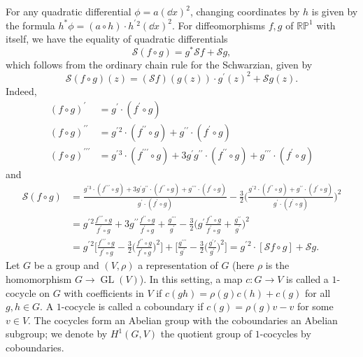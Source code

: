 \documentclass[11pt,leqno]{article}
\theoremstyle{plain}
\theoremstyle{definition}
\numberwithin{equation}{section}
\numberwithin{lem}{section}
\DeclareMathOperator{\GL}{GL}
\begin{document}
For any quadratic differential $\phi = a(\dd x)^2$, changing coordinates by $h$ is given by the formula $h^\ast\phi = (a\circ h)\cdot h^\prime{}^2(\dd x)^2$. For diffeomorphisms $f,g$ of $\mathbb{RP}^1$ with itself, we have the equality of quadratic differentials
\begin{equation}\label{eq: chain}
    \mathscr S(f\circ g) = g^\ast\mathscr Sf + \mathscr Sg,
\end{equation}
which follows from the ordinary chain rule for the Schwarzian, given by
\[\mathscr S(f\circ g)(z) = (\mathscr Sf)(g(z))\cdot g^{\prime}(z)^2 + \mathscr Sg(z).\]
Indeed, 
\begin{align*}
    (f\circ g)^{\prime} &= g^\prime\cdot (f^\prime\circ g)\\
    (f\circ g)^{\prime\prime} &= g^\prime{}^2\cdot(f^{\prime\prime}\circ g) + g^{\prime\prime}\cdot (f^\prime\circ g)\\
    (f\circ g)^{\prime\prime\prime} &= g^\prime{}^3\cdot(f^{\prime\prime\prime}\circ g) + 3g^\prime g^{\prime\prime}\cdot (f^{\prime\prime}\circ g) + g^{\prime\prime\prime}\cdot(f^\prime\circ g)
\end{align*}
and 
\begin{align*}
    \mathscr S(f\circ g) &= \frac{g^\prime{}^3\cdot(f^{\prime\prime\prime}\circ g) + 3g^\prime g^{\prime\prime}\cdot (f^{\prime\prime}\circ g) + g^{\prime\prime\prime}\cdot(f^\prime\circ g)}{g^\prime\cdot (f^\prime\circ g)} - \frac{3}{2}\biggl(\frac{g^\prime{}^2\cdot(f^{\prime\prime}\circ g) + g^{\prime\prime}\cdot (f^\prime\circ g)}{g^\prime\cdot (f^\prime\circ g)}\biggr)^2\\
    &=g^\prime{}^2\frac{f^{\prime\prime\prime}\circ g}{f^\prime\circ g} + 3g^{\prime\prime}\frac{f^{\prime\prime}\circ g}{f^\prime\circ g} + \frac{g^{\prime\prime\prime}}{g^\prime} - \frac{3}{2}\biggl(g^\prime\frac{f^{\prime\prime}\circ g}{f^\prime \circ g} + \frac{g^{\prime\prime}}{g^\prime}\biggr)^2\\
    &= g^\prime{}^2\biggl[\frac{f^{\prime\prime\prime}\circ g}{f^\prime \circ g}-\frac{3}{2}\biggl(\frac{f^{\prime\prime}\circ g}{f^\prime\circ g}\biggr)^2\biggr] + \biggl[\frac{g^{\prime\prime\prime}}{g^\prime} - \frac{3}{2}\biggl(\frac{g^\prime\prime}{g^\prime}\biggr)^2\biggr] = g^{\prime}{}^2\cdot [\mathscr Sf\circ g] + \mathscr Sg.
\end{align*}
Let $G$ be a group and $(V,\rho)$ a representation of $G$ (here $\rho$ is the homomorphism $G\to \GL(V)$). In this setting, a map $c\colon G\to V$ is called a $1$-cocycle on $G$ with coefficients in $V$ if $c(gh) = \rho(g)c(h) + c(g)$ for all $g,h\in G$. A $1$-cocycle is called a coboundary if $c(g) = \rho(g)v - v$ for some $v\in V$. The cocycles form an Abelian group with the coboundaries an Abelian subgroup; we denote by $H^1(G,V)$ the quotient group of $1$-cocycles by coboundaries.
\end{document}
